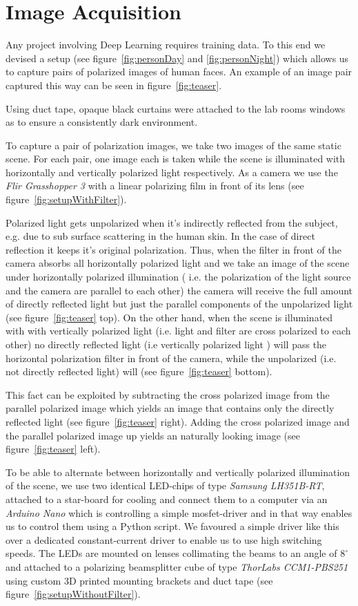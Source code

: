 \documentclass[sigconf]{acmart}
\begin{document}
\section{Image Acquisition}
Any project involving Deep Learning requires training data. To this end we devised a setup (see figure~\ref{fig:personDay} and \ref{fig:personNight}) which allows us to capture pairs of polarized images of human faces. An example of an image pair captured this way can be seen in figure~\ref{fig:teaser}.

Using duct tape, opaque black curtains were attached to the lab rooms windows as to ensure a consistently dark environment.

To capture a pair of polarization images, we take two images of the same static scene. For each pair, one image each is taken while the scene is illuminated with horizontally and vertically polarized light respectively. As a camera we use the \emph{Flir Grasshopper 3} with a linear polarizing film in front of its lens (see figure~\ref{fig:setupWithFilter}).

Polarized light gets unpolarized when it's indirectly reflected from the subject, e.g. due to sub surface scattering in the human skin. In the case of direct reflection it keeps it's original polarization. Thus, when the filter in front of the camera absorbs all horizontally polarized light and we take an image of the scene under horizontally polarized illumination ( i.e. the polarization of the light source and the camera are parallel to each other) the camera will receive the full amount of directly reflected light but just the parallel components of the unpolarized light (see figure~\ref{fig:teaser} top).
On the other hand, when the scene is illuminated with with vertically polarized light (i.e. light and filter are cross polarized to each other) no directly reflected light (i.e vertically polarized light ) will pass the horizontal polarization filter in front of the camera, while the unpolarized (i.e. not directly reflected light) will (see figure~\ref{fig:teaser} bottom).

This fact can be exploited by subtracting the cross polarized image from the parallel polarized image which yields an image that contains only the directly reflected light (see figure~\ref{fig:teaser} right). Adding the cross polarized image and the parallel polarized image up yields an naturally looking image (see figure~\ref{fig:teaser} left).

To be able to alternate between horizontally and vertically polarized illumination of the scene, we use two identical LED-chips of type \emph{Samsung LH351B-RT}, attached to a star-board for cooling and connect them to a computer via an \emph{Arduino Nano} which is controlling a simple mosfet-driver and in that way enables us to control them using a Python script. We favoured a simple driver like this over a dedicated constant-current driver to enable us to use high switching speeds. The LEDs are mounted on lenses collimating the beams to an angle of $8^\circ$ and attached to a polarizing beamsplitter cube of type \emph{ThorLabs CCM1-PBS251} using custom 3D printed mounting brackets and duct tape (see figure~\ref{fig:setupWithoutFilter}).
\end{document}
